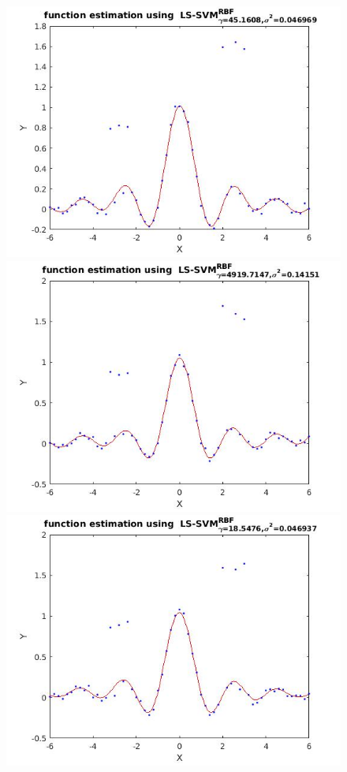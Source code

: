\documentclass[•]{article}
\begin{document}
\begin{figure}[H]
\centering
\begin{minipage}{.45\textwidth}
\includegraphics[width=.8\textwidth]{robusthuber.jpg}
\end{minipage}
\begin{minipage}{.45\textwidth}
\includegraphics[width=.8\textwidth]{robusthampel.jpg}
\end{minipage}
\begin{minipage}{.45\textwidth}
\includegraphics[width=.8\textwidth]{robustlogistic.jpg}

\end{minipage}
\end{figure}
\end{document}
